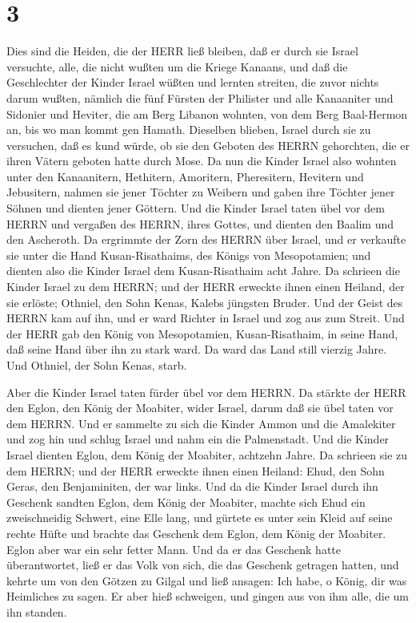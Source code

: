 \hypertarget{section-2}{%
\section{3}\label{section-2}}

 Dies sind die Heiden, die der HERR ließ bleiben, daß er
durch sie Israel versuchte, alle, die nicht wußten um die Kriege
Kanaans,  und daß die Geschlechter der Kinder Israel wüßten
und lernten streiten, die zuvor nichts darum wußten, 
nämlich die fünf Fürsten der Philister und alle Kanaaniter und Sidonier
und Heviter, die am Berg Libanon wohnten, von dem Berg Baal-Hermon an,
bis wo man kommt gen Hamath.  Dieselben blieben, Israel
durch sie zu versuchen, daß es kund würde, ob sie den Geboten des HERRN
gehorchten, die er ihren Vätern geboten hatte durch Mose. 
Da nun die Kinder Israel also wohnten unter den Kanaanitern, Hethitern,
Amoritern, Pheresitern, Hevitern und Jebusitern,  nahmen sie
jener Töchter zu Weibern und gaben ihre Töchter jener Söhnen und dienten
jener Göttern.  Und die Kinder Israel taten übel vor dem
HERRN und vergaßen des HERRN, ihres Gottes, und dienten den Baalim und
den Ascheroth.  Da ergrimmte der Zorn des HERRN über Israel,
und er verkaufte sie unter die Hand Kusan-Risathaims, des Königs von
Mesopotamien; und dienten also die Kinder Israel dem Kusan-Risathaim
acht Jahre.  Da schrieen die Kinder Israel zu dem HERRN; und
der HERR erweckte ihnen einen Heiland, der sie erlöste; Othniel, den
Sohn Kenas, Kalebs jüngsten Bruder.  Und der Geist des
HERRN kam auf ihn, und er ward Richter in Israel und zog aus zum Streit.
Und der HERR gab den König von Mesopotamien, Kusan-Risathaim, in seine
Hand, daß seine Hand über ihn zu stark ward.  Da ward das
Land still vierzig Jahre. Und Othniel, der Sohn Kenas, starb.

 Aber die Kinder Israel taten fürder übel vor dem HERRN. Da
stärkte der HERR den Eglon, den König der Moabiter, wider Israel, darum
daß sie übel taten vor dem HERRN.  Und er sammelte zu sich
die Kinder Ammon und die Amalekiter und zog hin und schlug Israel und
nahm ein die Palmenstadt.  Und die Kinder Israel dienten
Eglon, dem König der Moabiter, achtzehn Jahre.  Da schrieen
sie zu dem HERRN; und der HERR erweckte ihnen einen Heiland: Ehud, den
Sohn Geras, den Benjaminiten, der war links. Und da die Kinder Israel
durch ihn Geschenk sandten Eglon, dem König der Moabiter, 
machte sich Ehud ein zweischneidig Schwert, eine Elle lang, und gürtete
es unter sein Kleid auf seine rechte Hüfte  und brachte das
Geschenk dem Eglon, dem König der Moabiter. Eglon aber war ein sehr
fetter Mann.  Und da er das Geschenk hatte überantwortet,
ließ er das Volk von sich, die das Geschenk getragen hatten,
 und kehrte um von den Götzen zu Gilgal und ließ ansagen:
Ich habe, o König, dir was Heimliches zu sagen. Er aber hieß schweigen,
und gingen aus von ihm alle, die um ihn standen.

